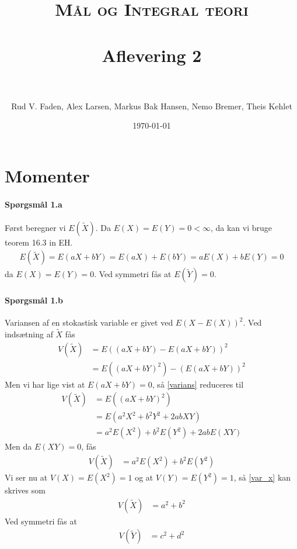 \documentclass{article} %
\title{
\normalfont \normalsize
\textsc{Mål og Integral teori} \\ [25pt] %
\horrule{0.5pt} \\[0.4cm] %
\huge Aflevering 2 \\ %
\horrule{2pt} \\[0.5cm] %
}
\author{Rud V. Faden, Alex Larsen, Markus Bak Hansen, Nemo Bremer, Theis Kehlet} %
\date{\normalsize\today} %
\begin{document}
\maketitle
\section*{Momenter}
\label{sec:title}

\paragraph*{Spørgsmål 1.a}
Først beregner vi \(E(\tilde{X})\). Da \(E(X)=E(Y)=0<\infty\), da kan vi bruge teorem 16.3 in EH.
\begin{align}
E(\tilde{X})=E(aX+bY)=E(aX)+E(bY)=aE(X)+bE(Y)=0
\end{align}
da \(E(X)=E(Y)=0\). Ved symmetri fås at \(E(\tilde{Y})=0\).
\paragraph*{Spørgsmål 1.b}
Variansen af en stokastisk variable er givet ved \(E(X-E(X))^2\). Ved indsætning af \(\tilde{X}\) fås
\begin{align}
	V(\tilde{X}) & = E\left((aX+bY)-E(aX+bY)\right)^2 \\
	           & = E\left((aX+bY)^2\right)-\left(E(aX+bY)\right)^2\label{varians}
\end{align}
Men vi har lige vist at \(E(aX+bY)=0\), så \eqref{varians} reduceres til
\begin{align}
	V(\tilde{X}) & = E\left((aX+bY)^2\right) \\
	           & = E\left(a^{2}X^2+b^2Y^2+2abXY\right) \\
	           & = a^2E(X^2)+b^2E(Y^2)+2abE(XY)
\end{align}
Men da \(E(XY)=0\), fås
\begin{align}
    V(\tilde{X}) &= a^2E(X^2)+b^2E(Y^2) \label{var_x}
\end{align}
Vi ser nu at \(V(X)=E(X^2)=1\) og at \(V(Y)=E(Y^2)=1\), så \cref{var_x} kan skrives som
\begin{align}
     V(\tilde{X}) &= a^2+b^2 \label{var_x_2}
\end{align}
Ved symmetri fås at
\begin{align}
    V(\tilde{Y}) &= c^2+d^2 \label{var_y}
\end{align}
\end{document}

